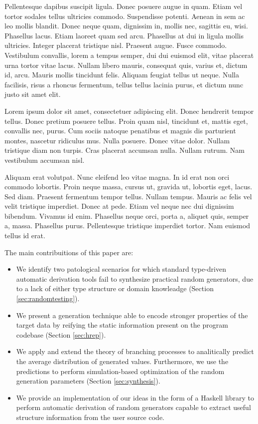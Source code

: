 \documentclass[conference, fleqn]{IEEEtran}
\begin{document}
Pellentesque dapibus suscipit ligula. Donec posuere augue in quam. Etiam vel
tortor sodales tellus ultricies commodo. Suspendisse potenti. Aenean in sem ac
leo mollis blandit. Donec neque quam, dignissim in, mollis nec, sagittis eu,
wisi. Phasellus lacus. Etiam laoreet quam sed arcu. Phasellus at dui in ligula
mollis ultricies. Integer placerat tristique nisl. Praesent augue. Fusce
commodo. Vestibulum convallis, lorem a tempus semper, dui dui euismod elit,
vitae placerat urna tortor vitae lacus. Nullam libero mauris, consequat quis,
varius et, dictum id, arcu. Mauris mollis tincidunt felis. Aliquam feugiat
tellus ut neque. Nulla facilisis, risus a rhoncus fermentum, tellus tellus
lacinia purus, et dictum nunc justo sit amet elit.

Lorem ipsum dolor sit amet, consectetuer adipiscing elit. Donec hendrerit tempor
tellus. Donec pretium posuere tellus. Proin quam nisl, tincidunt et, mattis
eget, convallis nec, purus. Cum sociis natoque penatibus et magnis dis
parturient montes, nascetur ridiculus mus. Nulla posuere. Donec vitae dolor.
Nullam tristique diam non turpis. Cras placerat accumsan nulla. Nullam rutrum.
Nam vestibulum accumsan nisl.

Aliquam erat volutpat. Nunc eleifend leo vitae magna. In id erat non orci
commodo lobortis. Proin neque massa, cursus ut, gravida ut, lobortis eget,
lacus. Sed diam. Praesent fermentum tempor tellus. Nullam tempus. Mauris ac
felis vel velit tristique imperdiet. Donec at pede. Etiam vel neque nec dui
dignissim bibendum. Vivamus id enim. Phasellus neque orci, porta a, aliquet
quis, semper a, massa. Phasellus purus. Pellentesque tristique imperdiet tortor.
Nam euismod tellus id erat\cite{grieco2017}.

The main contribuitions of this paper are:
%
\begin{itemize}
\item We identify two patological scenarios for which standard type-driven
  automatic derivation tools fail to synthesize practical random generators, due
  to a lack of either type structure or domain knowleadge (Section
  \ref{sec:randomtesting}).
\item We present a generation technique able to encode stronger properties of
  the target data by reifying the static information present on the program
  codebase (Section \ref{sec:hrep}).
\item We apply and extend the theory of branching processes to analitically
  predict the average distribution of generated values.
  Furthermore, we use the predictions to perform simulation-based optimization
  of the random generation parameters (Section \ref{sec:synthesis}).
\item We provide an implementation of our ideas in the form of a Haskell library
  to perform automatic derivation of random generators capable to extract
  useful structure information from the user source code.
\end{itemize}
\end{document}
